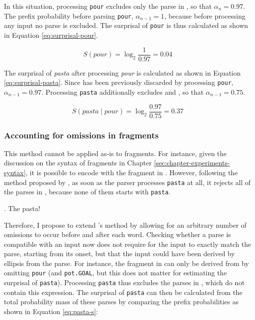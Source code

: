 In this situation, processing \texttt{pour} excludes only the parse in \Last[c], so that $\alpha_{n} = 0.97$. The prefix probability before parsing \texttt{pour}, $\alpha_{n-1} = 1$, because before processing any input no parse is excluded. The surprisal of \texttt{pour} is thus calculated as shown in Equation \ref{eq:surprisal-pour}.

\begin{equation}
 \displaystyle S(pour) = \log_2 \frac{1}{0.97} = 0.04 \label{eq:surprisal-pour}
\end{equation}

The surprisal of \textit{pasta} after processing \textit{pour} is calculated as shown in Equation \ref{eq:surprisal-pasta}. Since \Last[c] has been previously discarded by processing \texttt{pour}, $\alpha_{n-1} = 0.97$. Processing \texttt{pasta} additionally excludes \Last[b] and \Last[d], so that $\alpha_{n-1} = 0.75$.

\begin{equation}
 \displaystyle S(pasta\mathbin{|}pour) = \log_2 \frac{0.97}{0.75} = 0.37 \label{eq:surprisal-pasta}
\end{equation}

\subsubsection{Accounting for omissions in fragments}     

This method cannot be applied as-is to fragments. For instance, given the discussion on the syntax of fragments in Chapter \ref{sec:chapter-experiments-syntax}, it is possible to encode \Last[a] with the fragment in \Next. However, following the method proposed by \citet{hale2001}, as soon as the parser processes \texttt{pasta} at all, it rejects all of the parses in \Last, because none of them starts with \texttt{pasta}. 

\ex. The pasta!

Therefore, I propose to extend \citeauthor{hale2001}'s method by allowing for an arbitrary number of omissions to occur before and after each word. Checking whether a parse is compatible with an input now does not require for the input to exactly match the parse, starting from its onset, but that the input could have been derived by ellipsis from the parse. For instance, the fragment in \Last can only be derived from \LLast[a] by omitting \texttt{pour} (and \texttt{pot.GOAL}, but this does not matter for estimating the surprisal of \texttt{pasta}). Processing \texttt{pasta} thus excludes the parses in \LLast[b-d], which do not contain this expression. The surprisal of \texttt{pasta} can then be calculated from the total probability mass of these parses by comparing the prefix probabilities as shown in Equation \ref{eq:pasta-s}:

